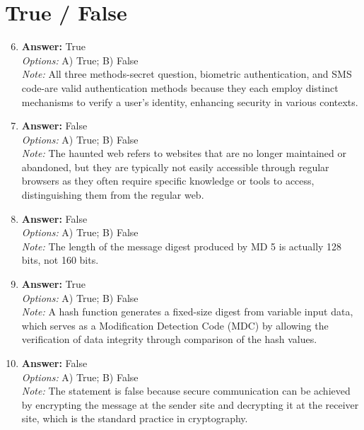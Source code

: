 \documentclass[12pt]{article}
\begin{document}
\section*{True / False}
\begin{enumerate}[label=\arabic*.]
\setcounter{enumi}{5}
\item \textbf{Answer:} True
\\ \textit{Options:} A) True; B) False
\\ \textit{Note:} All three methods-secret question, biometric authentication, and SMS code-are valid authentication methods because they each employ distinct mechanisms to verify a user's identity, enhancing security in various contexts.
\item \textbf{Answer:} False
\\ \textit{Options:} A) True; B) False
\\ \textit{Note:} The haunted web refers to websites that are no longer maintained or abandoned, but they are typically not easily accessible through regular browsers as they often require specific knowledge or tools to access, distinguishing them from the regular web.
\item \textbf{Answer:} False
\\ \textit{Options:} A) True; B) False
\\ \textit{Note:} The length of the message digest produced by MD 5 is actually 128 bits, not 160 bits.
\item \textbf{Answer:} True
\\ \textit{Options:} A) True; B) False
\\ \textit{Note:} A hash function generates a fixed-size digest from variable input data, which serves as a Modification Detection Code (MDC) by allowing the verification of data integrity through comparison of the hash values.
\item \textbf{Answer:} False
\\ \textit{Options:} A) True; B) False
\\ \textit{Note:} The statement is false because secure communication can be achieved by encrypting the message at the sender site and decrypting it at the receiver site, which is the standard practice in cryptography.
\end{enumerate}
\end{document}
